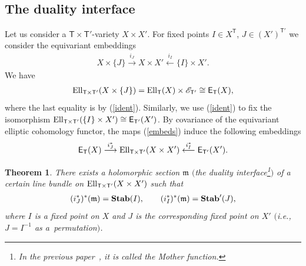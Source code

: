 \documentclass[pdftex]{sigma}
\newcommand{\bT}{\mathsf{T}}
\newcommand{\cE}{\mathscr{E}}
\numberwithin{equation}{section}
\newtheorem{Theorem}{Theorem}[section]
\begin{document}
\subsection{The duality interface}
Let us consider a $\bT\times \bT'$-variety $X\times X'$. For fixed points $I\in X^{\bT}$, $J\in (X')^{\bT'}$ we consider the equivariant embeddings
\begin{gather} \label{embeds}
X\times \{ J \} \stackrel{i_{J}}{\longrightarrow} X\times X' \stackrel{i_{I}}{\longleftarrow} \{I\}\times X' .
\end{gather}
We have
\begin{gather*}
{\rm Ell}_{\bT\times\bT'}(X\times \{ J \})={\rm Ell}_{\bT}(X)\times \cE_{\bT'}\cong \mathsf{E}_{\bT}(X),
\end{gather*}
where the last equality is by (\ref{ident}). Similarly, we use (\ref{ident})
to fix the isomorphism ${\rm Ell}_{\bT\times\bT'}(\{I\}\times X')\cong\mathsf{E}_{\bT'}(X')$. By covariance of the equivariant elliptic cohomology functor, the maps (\ref{embeds}) induce the following embeddings
\begin{gather*}
\mathsf{E}_{\bT}(X) \stackrel{i^{*}_{J}}{\longrightarrow} {\rm Ell}_{\bT\times\bT' }(X\times X' )\stackrel{i^{*}_{I}}{\longleftarrow} \mathsf{E}_{\bT'}(X').
\end{gather*}

\begin{Theorem} There exists a holomorphic section ${\mathfrak{m}}$ $($the \emph{duality interface}\footnote{In the previous paper~\cite{RVSZ}, it is called the \emph{Mother function}.}$)$ of a certain line bundle on ${\rm Ell}_{\bT\times\bT' }(X\times X' )$ such that
 \begin{gather*}
 (i^{*}_{J})^*({\mathfrak{m}})= {\bf Stab}(I), \qquad (i^{*}_{I})^*({\mathfrak{m}})= {\bf Stab}' (J),
 \end{gather*}
 where $I$ is a fixed point on $X$ and $J$ is the corresponding fixed point on $X'$ $($i.e., $J=I^{-1}$ as a~permutation$)$.
\end{Theorem}
\end{document}
